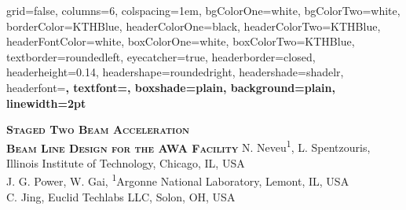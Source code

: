 \documentclass[portrait,final,paperwidth=120cm, paperheight=240cm,  fontscale=0.277]{baposter}
\begin{document}
\begin{poster}{
	grid=false,
	columns=6,
	colspacing=1em,
	bgColorOne=white,
	bgColorTwo=white,
	borderColor=KTHBlue,
	headerColorOne=black,
	headerColorTwo=KTHBlue,
	headerFontColor=white,
	boxColorOne=white,
	boxColorTwo=KTHBlue,
	textborder=roundedleft,
	eyecatcher=true,
	headerborder=closed,
	headerheight=0.14\textheight,
	headershape=roundedright,
	headershade=shadelr,
	headerfont=\Large\bf\textsc, %
	textfont={\setlength{\parindent}{0em}},
	boxshade=plain,
	background=plain,
	linewidth=2pt
}
{
	
	 }
{\bf\textsc{Staged Two Beam Acceleration \\Beam Line Design for the AWA Facility}}%
{\vspace{1em}
	N. Neveu\textsuperscript{1}, L. Spentzouris, Illinois Institute of Technology, Chicago, IL, USA \\
	J. G. Power, W. Gai, \textsuperscript{1}Argonne National  Laboratory, Lemont, IL, USA \\
	C. Jing, Euclid Techlabs LLC, Solon, OH, USA \\
    }
{%

}




\end{poster}
\end{document}

